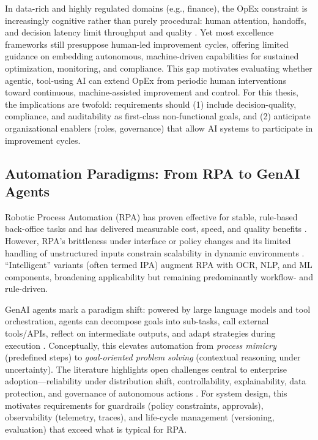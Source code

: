In data-rich and highly regulated domains (e.g., finance), the OpEx constraint is increasingly cognitive rather than purely procedural: human attention, handoffs, and decision latency limit throughput and quality \parencite{Hammer2004,Davenport2018}. Yet most excellence frameworks still presuppose human-led improvement cycles, offering limited guidance on embedding autonomous, machine-driven capabilities for sustained optimization, monitoring, and compliance. This gap motivates evaluating whether agentic, tool-using AI can extend OpEx from periodic human interventions toward continuous, machine-assisted improvement and control. For this thesis, the implications are twofold: requirements should (1) include decision-quality, compliance, and auditability as first-class non-functional goals, and (2) anticipate organizational enablers (roles, governance) that allow AI systems to participate in improvement cycles.
\subsection{Automation Paradigms: From RPA to GenAI Agents}
Robotic Process Automation (RPA) has proven effective for stable, rule-based back-office tasks and has delivered measurable cost, speed, and quality benefits \parencite{Lacity2016}. However, RPA’s brittleness under interface or policy changes and its limited handling of unstructured inputs constrain scalability in dynamic environments \parencite{Syed2021}. ``Intelligent'' variants (often termed IPA) augment RPA with OCR, NLP, and ML components, broadening applicability but remaining predominantly workflow- and rule-driven.

GenAI agents mark a paradigm shift: powered by large language models and tool orchestration, agents can decompose goals into sub-tasks, call external tools/APIs, reflect on intermediate outputs, and adapt strategies during execution \parencite{Park2023,Rodriguez_Agents_2025}. Conceptually, this elevates automation from \emph{process mimicry} (predefined steps) to \emph{goal-oriented problem solving} (contextual reasoning under uncertainty). The literature highlights open challenges central to enterprise adoption—reliability under distribution shift, controllability, explainability, data protection, and governance of autonomous actions \parencite{Bommasani2022}. For system design, this motivates requirements for guardrails (policy constraints, approvals), observability (telemetry, traces), and life-cycle management (versioning, evaluation) that exceed what is typical for RPA.
